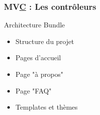 
\begin{frame}
  \frametitle{MV\underline{C} : Les contrôleurs}
  \begin{block}{Architecture Bundle}
  \begin{itemize}
  \item Structure du projet	
  \item Pages d'accueil
  \item Page "à propos"
  \item Page "FAQ"
  \item Templates et thèmes
  \end{itemize}
  \end{block}   
  \end{frame}
